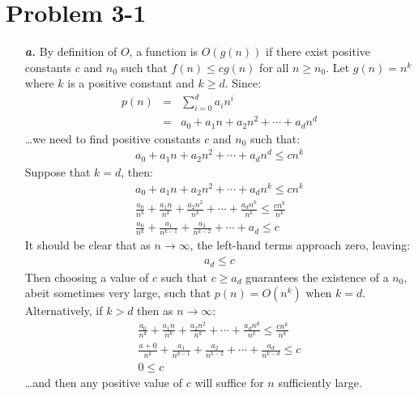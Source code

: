 \documentclass{article}
\begin{document}
\section*{Problem 3-1}

\noindent\begin{enumerate}
	\item[\textbf{\textit{a.}}] By definition of $O$, a function is $O(g(n))$ if there exist positive constants $c$ and $n_0$ such that $f(n) \leq c g(n)$ for all $n \geq n_0$. Let $g(n) = n^k$ where $k$ is a positive constant and $k \geq d$. Since:
		\begin{eqnarray*}
			p(n) & = & \sum_{i=0}^d a_i n^i \\
			& = & a_0 + a_1 n + a_2 n^2 + \cdots + a_d n^d
		\end{eqnarray*}
		\ldots we need to find positive constants $c$ and $n_0$ such that:
		\begin{eqnarray*}
			a_0 + a_1 n + a_2 n^2 + \cdots + a_d n^d \leq c n^k
		\end{eqnarray*}
		Suppose that $k = d$, then:
		\begin{eqnarray*}
			a_0 + a_1 n + a_2 n^2 + \cdots + a_d n^k \leq c n^k \\
			\frac{a_0}{n^k} + \frac{a_1 n}{n^k} + \frac{a_2 n^2}{n^k} + \cdots + \frac{a_d n^k}{n^k} \leq \frac{c n^k}{n^k} \\
			\frac{a_0}{n^k} + \frac{a_1}{n^{k-1}} + \frac{a_2}{n^{k-2}} + \cdots + a_d \leq c
		\end{eqnarray*}
		It should be clear that as $n \rightarrow \infty$, the left-hand terms approach zero, leaving:
		\begin{eqnarray*}
			a_d \leq c
		\end{eqnarray*}
		Then choosing a value of $c$ such that $c \geq a_d$ guarantees the existence of a $n_0$, abeit sometimes very large, such that $p(n) = O(n^k)$ when $k = d$. Alternatively, if $k > d$ then as $n \rightarrow \infty$:
		\begin{eqnarray*}
			\frac{a_0}{n^k} + \frac{a_1 n}{n^k} + \frac{a_2 n^2}{n^k} + \cdots + \frac{a_d n^d}{n^k} \leq \frac{c n^k}{n^k} \\
			\frac{a+0}{n^k} + \frac{a_1}{n^{k-1}} + \frac{a_2}{n^{k-2}} + \cdots + \frac{a_d}{n^{k-d}} \leq c \\
			0 \leq c
		\end{eqnarray*}
		\ldots and then any positive value of $c$ will suffice for $n$ sufficiently large.
		

\end{enumerate}
\end{document}
